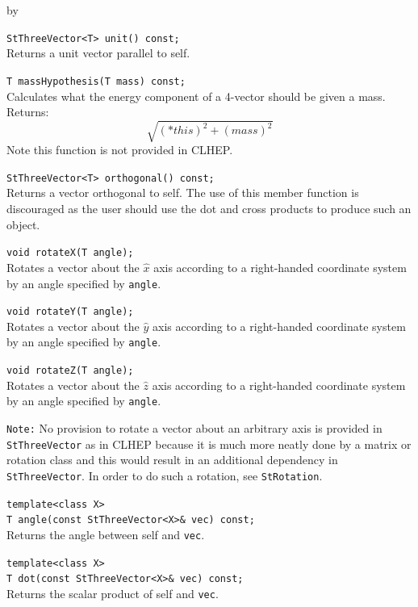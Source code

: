 \documentclass[twoside]{article}
\newcommand{\comp}[1]{\texttt{#1}}%
\newcommand{\entrylabel}[1]{\mbox{\textbf{{#1}}}\hfil}%
\newenvironment{entry}
{\begin{list}{}%
    {\renewcommand{\makelabel}{\entrylabel}%
     \setlength{\labelwidth}{90pt}%
     \setlength{\leftmargin}{\labelwidth}
     \advance\leftmargin by \labelsep%
      }%
    }%
  {\end{list}}
\newcommand{\Entrylabel}[1]%
{\raisebox{0pt}[1ex][0pt]{\makebox[\labelwidth][l]%
    {\parbox[t]{\labelwidth}{\hspace{0pt}\textbf{{#1}}}}}}
\newenvironment{Entry}%
{\renewcommand{\entrylabel}{\Entrylabel}\begin{entry}}%
  {\end{entry}}
\begin{document}
\begin{description}
\begin{Entry}
    \verb+StThreeVector<T> unit() const;+\\
    Returns a unit vector parallel to self.

    \verb+T massHypothesis(T mass) const;+\\
    Calculates what the energy component of a 4-vector
    should be given a mass.  Returns:
    \begin{equation*}
      \sqrt{(*this)^{2} + (mass)^{2}}
    \end{equation*}
    Note this function is not provided in CLHEP.
    
    \verb+StThreeVector<T> orthogonal() const;+\\
    Returns a vector orthogonal to self.  The use of this
    member function is discouraged as the user should
    use the dot and cross products to produce such an
    object.

    \verb+void rotateX(T angle);+\\
    Rotates a vector about the $\hat{x}$ axis according to a right-handed
    coordinate system by an angle specified by \texttt{angle}.

    \verb+void rotateY(T angle);+\\
    Rotates a vector about the $\hat{y}$ axis according to a right-handed
    coordinate system by an angle specified by \texttt{angle}.

    \verb+void rotateZ(T angle);+\\
    Rotates a vector about the $\hat{z}$ axis according to a right-handed
    coordinate system by an angle specified by \texttt{angle}.

    \comp{Note:} No provision to rotate a vector about an arbitrary axis
    is provided in \comp{StThreeVector} as in CLHEP because it is much
    more neatly done by a matrix or rotation class and this would result
    in an additional dependency in \comp{StThreeVector}.  In order
    to do such a rotation, see \comp{StRotation}.\label{StRotation}
    
    \verb+template<class X>+\\
    \verb+T angle(const StThreeVector<X>& vec) const;+\\
    Returns the angle between self and \comp{vec}.
    
    \verb+template<class X>+\\
    \verb+T dot(const StThreeVector<X>& vec) const;+\\
    Returns the scalar product of self and \comp{vec}.
    

\end{Entry}
\end{description}
\end{document}
